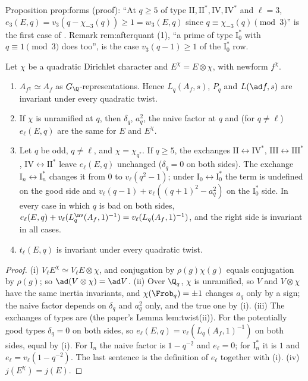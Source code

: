 \begin{paperlink}
Proposition prop:forms (proof): ``At $q\ge5$ of type $\mathrm{II},\mathrm{II}^*,\mathrm{IV},\mathrm{IV}^*$ and $\ell=3$, $e_3(E,q)=v_3(q-\chi_{-3}(q))\ge1=w_3(E,q)$ since $q\equiv\chi_{-3}(q)\pmod3$'' is the
first case of . Remark rem:afterquant (1), ``a prime of type $\mathrm{I}_0^*$ with $q\equiv1\pmod3$ does too'', is the case $v_3(q-1)\ge1$ of the
$\mathrm I_0^*$ row.
\end{paperlink}

\begin{proposition}\label{prop:lfunctions:twists}
Let $\chi$ be a quadratic Dirichlet character and $E^\chi=E\otimes\chi$, with newform $f^\chi$.
\begin{enumerate}[label=(\roman*)]
\item $A_{f^\chi}\simeq A_f$ as $G_\Q$-representations. Hence $L_q(A_f,s)$, $P_q$ and $L(\ad f,s)$ are invariant under every quadratic twist.
\item If $\chi$ is unramified at $q$, then $\delta_q$, $a_q^2$, the naive factor at $q$ and (for $q\ne\ell$) $e_\ell(E,q)$ are the same for $E$ and $E^\chi$.
\item Let $q$ be odd, $q\ne\ell$, and $\chi=\chi_{q^*}$. If $q\ge5$, the exchanges $\mathrm{II}\leftrightarrow\mathrm{IV}^*$, $\mathrm{III}\leftrightarrow\mathrm{III}^*$, $\mathrm{IV}\leftrightarrow\mathrm{II}^*$ leave
$e_\ell(E,q)$ unchanged ($\delta_q=0$ on both sides). The exchange $\mathrm I_n\leftrightarrow\mathrm I_n^*$ changes it from $0$ to $v_\ell(q^2-1)$; under $\mathrm I_0\leftrightarrow\mathrm I_0^*$ the
term is undefined on the good side and $v_\ell(q-1)+v_\ell((q+1)^2-a_q^2)$ on the $\mathrm I_0^*$ side. In every case in which $q$ is bad on both sides,
$e_\ell(E,q)+v_\ell(L_q^{\nv}(A_f,1)^{-1})=v_\ell(L_q(A_f,1)^{-1})$, and the right side is invariant in all cases.
\item $t_\ell(E,q)$ is invariant under every quadratic twist.
\end{enumerate}
\end{proposition}

\begin{proof}
(i) $V_\ell E^\chi\simeq V_\ell E\otimes\chi$, and conjugation by $\rho(g)\chi(g)$ equals conjugation by $\rho(g)$; so $\ad(V\otimes\chi)=\ad V$. (ii) Over $\Q_q$, $\chi$ is unramified, so $V$ and
$V\otimes\chi$ have the same inertia invariants, and $\chi(\Frob_q)=\pm1$ changes $a_q$ only by a sign; the naive factor depends on $\delta_q$ and $a_q^2$ only, and the true one by
(i). (iii) The exchanges of types are  (the paper's Lemma lem:twist(ii)). For the potentially good types $\delta_q=0$ on both sides, so $e_\ell(E,q)=v_\ell(L_q(A_f,1)^{-1})$
on both sides, equal by (i). For $\mathrm I_n$ the naive factor is $1-q^{-2}$ and $e_\ell=0$; for $\mathrm I_n^*$ it is $1$ and $e_\ell=v_\ell(1-q^{-2})$. The last sentence is the definition of
$e_\ell$ together with (i). (iv) $j(E^\chi)=j(E)$.
\end{proof}

